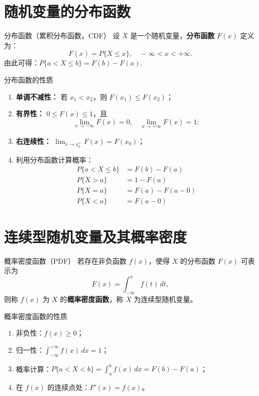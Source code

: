 \section{随机变量的分布函数}

\begin{mydefinition}{分布函数（累积分布函数，CDF）}
	设 $X$ 是一个随机变量，\textbf{分布函数} $F(x)$ 定义为：
	\[F(x) = P\{X \leq x\},\quad -\infty < x < +\infty.\]
	由此可得：$P\{a < X \leq b\} = F(b) - F(a).$
\end{mydefinition}

\begin{myproperty}{分布函数的性质}
\begin{enumerate}
	\item \textbf{单调不减性：} 若 $x_1 < x_2$，则 $F(x_1) \leq F(x_2)$；
	\item \textbf{有界性：} $0 \leq F(x) \leq 1$，且
	\[\lim_{x \to -\infty} F(x) = 0,\quad \lim_{x \to +\infty} F(x) = 1;\]
	\item \textbf{右连续性：} $\displaystyle\lim_{x \to x_0^+} F(x) = F(x_0)$；
	\item 利用分布函数计算概率：
	\begin{align*}
		P\{a < X \leq b\} &= F(b) - F(a) \\
		P\{X > a\} &= 1 - F(a) \\
		P\{X = a\} &= F(a) - F(a-0) \\
		P\{X < a\} &= F(a-0)
	\end{align*}
\end{enumerate}
\end{myproperty}

\section{连续型随机变量及其概率密度}

\begin{mydefinition}{概率密度函数（PDF）}
	若存在非负函数 $f(x)$，使得 $X$ 的分布函数 $F(x)$ 可表示为
	\[F(x) = \int_{-\infty}^{x} f(t)\,dt,\]
	则称 $f(x)$ 为 $X$ 的\textbf{概率密度函数}，称 $X$ 为连续型随机变量。
\end{mydefinition}

\begin{myproperty}{概率密度函数的性质}
\begin{enumerate}
	\item 非负性：$f(x) \geq 0$；
	\item 归一性：$\displaystyle\int_{-\infty}^{+\infty} f(x)\,dx = 1$；
	\item 概率计算：$\displaystyle P\{a < X < b\} = \int_{a}^{b} f(x)\,dx = F(b) - F(a)$；
	\item 在 $f(x)$ 的连续点处：$F'(x) = f(x)$。
\end{enumerate}
\end{myproperty}

